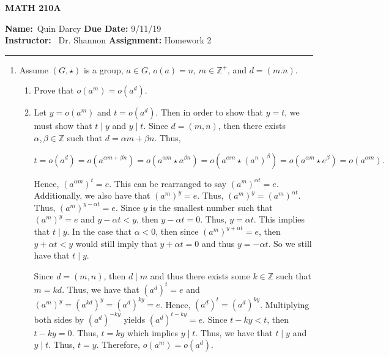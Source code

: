 \documentclass[12pt]{article}
\makeatletter
\theoremstyle{definition}
\theoremstyle{remark}
\renewenvironment{proof}[1][\proofname]{\par
  \pushQED{\qed}%
  \normalfont \topsep6\p@\@plus6\p@\relax
  \list{}{\leftmargin=0mm
          \rightmargin=4mm
          \settowidth{\itemindent}{\itshape#1}%
          \labelwidth=\itemindent
          \parsep=0pt \listparindent=\parindent 
  }
  \item[\hskip\labelsep
        \itshape
    #1\@addpunct{.}]\ignorespaces
}{%
  \popQED\endlist\@endpefalse
}
\let\oldproofname=\proofname
\renewcommand{\proofname}{\bf{\textit{\oldproofname}}}
\makeatother
\begin{document}
\begin{center}
	\vspace{.4cm} {\textbf { \large MATH 210A}}
\end{center}
{\textbf{Name:}\ Quin Darcy \hspace{\fill} \textbf{Due Date:} 9/11/19   \\
{ \textbf{Instructor:}} \ Dr. Shannon \hspace{\fill} \textbf{Assignment:} Homework 2 \\ \hrule}

\justifying

\begin{enumerate}[leftmargin=*]

    \item Assume $(G,\star)$ is a group, $a\in G$, $o(a)=n$, $m\in\mathbb{Z}^{+}$, and $d=(m.n)$.
    
        \begin{enumerate}[label=(\alph*)]
            \item Prove that $o(a^m)=o(a^d)$.
                \begin{proof}
                    Let $y=o(a^m)$ and $t=o(a^d)$. Then in order to show that $y=t$, we must show that $t\mid y$ and $y\mid t$. Since $d=(m,n)$, then there exists $\alpha,\beta\in\mathbb{Z}$ such that $d=\alpha m+\beta n$. Thus,
                    
                    \begin{equation*}
                            t = o(a^d) 
                            = o(a^{\alpha m+\beta n}) 
                            = o(a^{\alpha m}\star a^{\beta n}) 
                            = o(a^{\alpha m}\star(a^n)^{\beta}) 
                            = o(a^{\alpha m}\star e^{\beta}) 
                            = o(a^{\alpha m}).
                    \end{equation*}
                    
                    Hence, $(a^{\alpha m})^t=e$. This can be rearranged to say $(a^m)^{\alpha t}=e$. Additionally, we also have that $(a^m)^y=e$. Thus, $(a^m)^y=(a^m)^{\alpha t}$. Thus, $(a^m)^{y-\alpha t}=e$. Since $y$ is the smallest number such that $(a^m)^y=e$ and $y-\alpha t<y$, then $y-\alpha t=0$. Thus, $y=\alpha t$. This implies that $t\mid y$. In the case that $\alpha<0$, then since $(a^m)^{y+\alpha t}=e$, then $y+\alpha t<y$ would still imply that $y+\alpha t=0$ and thus $y=-\alpha t$. So we still have that $t\mid y$.\par\hspace{4mm} Since $d=(m,n)$, then $d\mid m$ and thus there exists some $k\in\mathbb{Z}$ such that $m=kd$. Thus, we have that $(a^d)^t=e$ and $(a^m)^y=(a^{kd})^y=(a^d)^{ky}=e$. Hence, $(a^d)^t=(a^d)^{ky}$. Multiplying both sides by $(a^d)^{-ky}$ yields $(a^d)^{t-ky}=e$. Since $t-ky<t$, then $t-ky=0$. Thus, $t=ky$ which implies $y\mid t$. Thus, we have that $t\mid y$ and $y\mid t$. Thus, $t=y$. Therefore, $o(a^m)=o(a^d)$.
                \end{proof}
                

\end{enumerate}
\end{enumerate}
\end{document}
